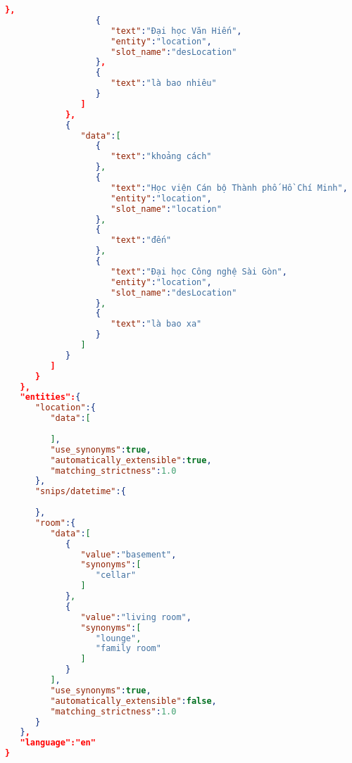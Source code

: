 \begin{lstlisting}[language=json,firstnumber=1]
                  },
                  {
                     "text":"Đại học Văn Hiến",
                     "entity":"location",
                     "slot_name":"desLocation"
                  },
                  {
                     "text":"là bao nhiêu"
                  }
               ]
            },
            {
               "data":[
                  {
                     "text":"khoảng cách"
                  },
                  {
                     "text":"Học viện Cán bộ Thành phố Hồ Chí Minh",
                     "entity":"location",
                     "slot_name":"location"
                  },
                  {
                     "text":"đến"
                  },
                  {
                     "text":"Đại học Công nghệ Sài Gòn",
                     "entity":"location",
                     "slot_name":"desLocation"
                  },
                  {
                     "text":"là bao xa"
                  }
               ]
            }
         ]
      }
   },
   "entities":{
      "location":{
         "data":[
            
         ],
         "use_synonyms":true,
         "automatically_extensible":true,
         "matching_strictness":1.0
      },
      "snips/datetime":{
         
      },
      "room":{
         "data":[
            {
               "value":"basement",
               "synonyms":[
                  "cellar"
               ]
            },
            {
               "value":"living room",
               "synonyms":[
                  "lounge",
                  "family room"
               ]
            }
         ],
         "use_synonyms":true,
         "automatically_extensible":false,
         "matching_strictness":1.0
      }
   },
   "language":"en"
}
\end{lstlisting}
